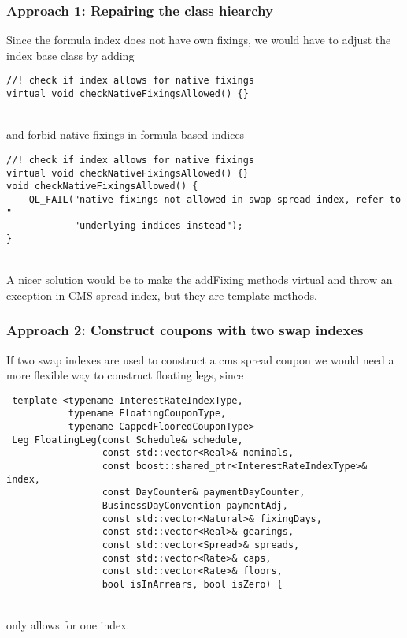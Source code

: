 \documentclass{beamer}
\begin{document}
\begin{frame}[fragile]
\frametitle{Approach 1: Repairing the class hiearchy}
Since the formula index does not have own fixings, we would have to
adjust the index base class by adding
\vspace{2mm}
\begin{verbatim}
//! check if index allows for native fixings
virtual void checkNativeFixingsAllowed() {}
\end{verbatim}
\\
\vspace{2mm}
and forbid native fixings in formula based indices
\vspace{2mm}
\begin{verbatim}
//! check if index allows for native fixings
virtual void checkNativeFixingsAllowed() {}
void checkNativeFixingsAllowed() {
    QL_FAIL("native fixings not allowed in swap spread index, refer to "
            "underlying indices instead");
}
\end{verbatim}
\\
\vspace{2mm}
A nicer solution would be to make the addFixing methods virtual and throw
an exception in CMS spread index, but they are template methods.
\end{frame}

\begin{frame}[fragile]
\frametitle{Approach 2: Construct coupons with two swap indexes}
If two swap indexes are used to construct a cms spread coupon we would need
a more flexible way to construct floating legs, since
\vspace{2mm}
\begin{verbatim}
 template <typename InterestRateIndexType,
           typename FloatingCouponType,
           typename CappedFlooredCouponType>
 Leg FloatingLeg(const Schedule& schedule,
                 const std::vector<Real>& nominals,
                 const boost::shared_ptr<InterestRateIndexType>& index,
                 const DayCounter& paymentDayCounter,
                 BusinessDayConvention paymentAdj,
                 const std::vector<Natural>& fixingDays,
                 const std::vector<Real>& gearings,
                 const std::vector<Spread>& spreads,
                 const std::vector<Rate>& caps,
                 const std::vector<Rate>& floors,
                 bool isInArrears, bool isZero) {
\end{verbatim}
\\
\vspace{2mm}
only allows for one index. 
\end{frame}
\end{document}
